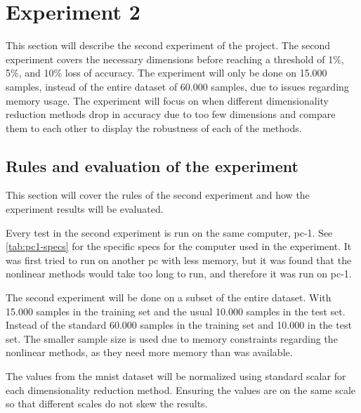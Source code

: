 \section{Experiment 2}\label{sec:experiment-2}
This section will describe the second experiment of the project. The second experiment covers the necessary dimensions before reaching a threshold of 1\%, 5\%, and 10\% loss of accuracy. The experiment will only be done on 15.000 samples, instead of the entire dataset of 60.000 samples, due to issues regarding memory usage. The experiment will focus on when different dimensionality reduction methods drop in accuracy due to too few dimensions and compare them to each other to display the robustness of each of the methods.


\subsection{Rules and evaluation of the experiment}\label{subsec:experiment_2_rules}
This section will cover the rules of the second experiment and how the experiment results will be evaluated.

Every test in the second experiment is run on the same computer, pc-1. See \autoref{tab:pc1-specs} for the specific specs for the computer used in the experiment. It was first tried to run on another pc with less memory, but it was found that the nonlinear methods would take too long to run, and therefore it was run on pc-1.

The second experiment will be done on a subset of the entire dataset. With 15.000 samples in the training set and the usual 10.000 samples in the test set. Instead of the standard 60.000 samples in the training set and 10.000 in the test set. The smaller sample size is used due to memory constraints regarding the nonlinear methods, as they need more memory than was available.

The values from the mnist dataset will be normalized using standard scalar for each dimensionality reduction method. Ensuring the values are on the same scale so that different scales do not skew the results.

